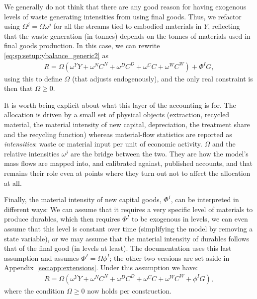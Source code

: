 We generally do not think that there are any good reason for having exogenous levels of waste generating intensities from using final goods. Thus, we refactor using $\Omega^j = \Omega \omega^j$ for all the streams tied to embodied materials in $Y$, reflecting that the waste generation (in tonnes) depends on the tonnes of materials used in final goods production. In this case, we can rewrite \eqref{eq:sp:setup:ybalance_generic2} as
\begin{align}
    R =  \Omega \left(\omega^Y Y + \omega^{N}C^N + \omega^{D}C^D + \omega^C C + \omega^W C^W\right) + \Phi^I G \label{eq:sp:setup:ybalance_Omega},
\end{align}
using this to define $\Omega$ (that adjusts endogenously), and the only real constraint is then that $\Omega\geq0$.

It is worth being explicit about what this layer of the accounting is for. The allocation is driven by a small set of physical objects (extraction, recycled material, the material intensity of new capital, depreciation, the treatment share and the recycling function) whereas material-flow statistics are reported as \emph{intensities}: waste or material input per unit of economic activity. $\Omega$ and the relative intensities $\omega^j$ are the bridge between the two. They are how the model's mass flows are mapped into, and calibrated against, published accounts, and that remains their role even at points where they turn out not to affect the allocation at all.

Finally, the material intensity of new capital goods, $\Phi^I$, can be interpreted in different ways: We can assume that it requires a very specific level of materials to produce durables, which then requires $\Phi^I$ to be exogenous in levels, we can even assume that this level is constant over time (simplifying the model by removing a state variable), or we may assume that the material intensity of durables follows that of the final good (in levels at least). The documentation uses this last assumption and assumes $\Phi^I = \Omega \phi^I$; the other two versions are set aside in Appendix~\ref{sec:app:extensions}. Under this assumption we have:
\begin{align}
    R =  \Omega \left(\omega^Y Y + \omega^{N}C^N + \omega^{D}C^D + \omega^C C + \omega^W C^W+\phi^I G\right) \label{eq:sp:setup:ybalance_OmegaPhi},
\end{align}
where the condition $\Omega\geq0$ now holds per construction.

